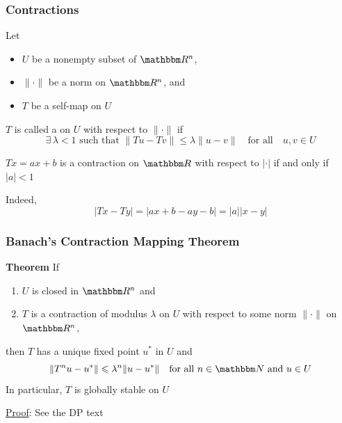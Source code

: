 \begin{frame}
    \frametitle{Contractions}
    
    Let 
    \begin{itemize}
        \item $U$ be a nonempty subset of $\RR^n$,
        \item $\| \cdot \|$ be a norm on $\RR^n$, and
        \item $T$ be a self-map on $U$

    \end{itemize}

    $T$ is called a  on $U$ with respect
    to $\| \cdot \|$ if 
    \begin{equation*}
        \text{$\exists \, \lambda < 1$ such that }
        \| Tu - Tv \| \leq \lambda \| u - v \| \quad \text{for all} \quad u, v \in U
    \end{equation*}

    \Eg $Tx = ax + b$ is a contraction on $\RR$ with respect to $| \cdot |$ 
    if and only if $|a|<1$

    Indeed, 
    \begin{equation*}
        |Tx - Ty| = |ax + b - ay - b| = |a| |x -y|
    \end{equation*}
    


\end{frame}




\begin{frame}
    \frametitle{Banach's Contraction Mapping Theorem}
    
    {\bf Theorem} If 
    \begin{enumerate}
        \item $U$ is closed in $\RR^n$ and
        \item $T$ is a contraction of modulus $\lambda$ on $U$
        with respect to some norm $\| \cdot \|$ on $\RR^n$,
    \end{enumerate}
    then $T$ has a unique fixed point $u^*$ in $U$ and 
    \begin{equation*}
        \| T^n u - u^* \| \leq \lambda^n \| u - u^* \|
        \quad \text{for all } n \in \NN \text{ and } u \in U
    \end{equation*}
    In particular, $T$ is globally stable on $U$

    \vspace{1em}

    \underline{Proof}: See the DP text

\end{frame}



